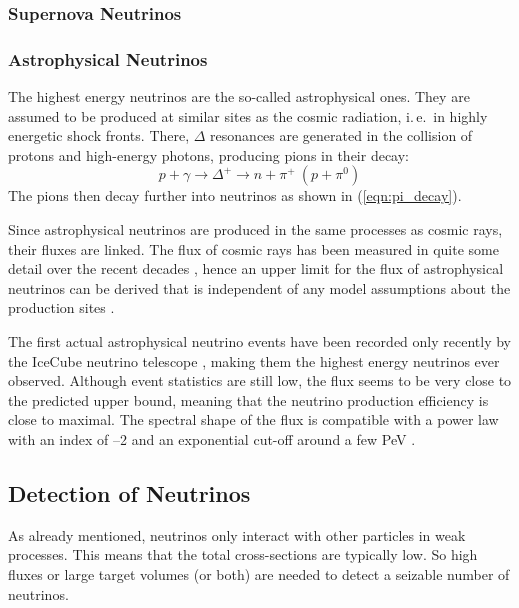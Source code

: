 \subsubsection{Supernova Neutrinos}

\subsubsection{Astrophysical Neutrinos}

The highest energy neutrinos are the so-called astrophysical ones. They are  
assumed to be produced at similar sites as the cosmic radiation, i.\,e.\ in 
highly energetic shock fronts. There, $\Delta$ resonances are generated in the 
collision of protons and high-energy photons, producing pions in their decay:
\begin{equation}
 p + \gamma \to \Delta^+ \to n + \pi^+\ (p + \pi^0)
\end{equation}
The pions then decay further into neutrinos as shown in (\ref{eqn:pi_decay}).

Since astrophysical neutrinos are produced in the same processes as cosmic 
rays, their fluxes are linked. The flux of cosmic rays has been measured in 
quite some detail over the recent decades \cite{CosmRaySpec}, hence an upper 
limit for the flux of astrophysical neutrinos can be derived that is 
independent of any model assumptions about the production sites \cite{WB_bound}.

The first actual astrophysical neutrino events have been recorded only recently 
by the IceCube neutrino telescope \cite{HESE, HESE_3yr}, making them the 
highest energy neutrinos ever observed. Although event statistics are still 
low, the flux seems to be very close to the predicted upper bound, meaning that 
the neutrino production efficiency is close to maximal. The spectral shape of 
the flux is compatible with a power law with an index of --2 and an exponential 
cut-off around a few PeV \cite{Lars_globalfit}.

\subsection{Detection of Neutrinos}

As already mentioned, neutrinos only interact with other particles in weak
processes. This means that the total cross-sections are typically low. So high
fluxes or large target volumes (or both) are needed to detect a seizable
number of neutrinos.

